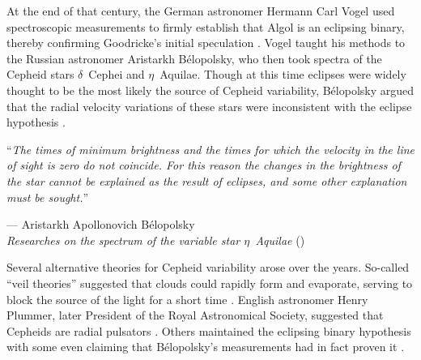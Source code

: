 
At the end of that century, the German astronomer Hermann Carl Vogel used spectroscopic measurements to firmly establish that Algol is an eclipsing binary, thereby confirming Goodricke's initial speculation \citep{1889AN....121..241V, 1908ApJ....27....1F}. 
Vogel taught his methods to the Russian astronomer Aristarkh B{\'e}lopolsky, who then took spectra of the Cepheid stars $\delta$~Cephei and $\eta$~Aquilae. 
Though at this time eclipses were widely thought to be the most likely the source of Cepheid variability, B{\'e}lopolsky argued that the radial velocity variations of these stars were inconsistent with the eclipse hypothesis \citep{1897ApJ.....6..393B, 1895ApJ.....1..160B}. 
\epigraph{``\emph{The times of minimum brightness and the times for which the velocity in the line \hphantom{``}of sight is zero do not coincide. For this reason the changes in the brightness of \hphantom{``}the star cannot be explained as the result of eclipses, and some other explanation \hphantom{``}must be sought.}''}{--- Aristarkh Apollonovich B{\'e}lopolsky \\\textit{Researches on the spectrum of the variable star $\eta$~Aquilae} (\citeyear{1897ApJ.....6..393B})}

Several alternative theories for Cepheid variability arose over the years. 
So-called ``veil theories'' suggested that clouds could rapidly form and evaporate, serving to block the source of the light for a short time \citep[e.g.,][]{1889Natur..39..606B}. 
English astronomer Henry Plummer, later President of the Royal Astronomical Society, suggested that Cepheids are radial pulsators \citep{1914MNRAS..74..660P}. 
Others maintained the eclipsing binary hypothesis \citep[e.g.,][]{1909LicOB...5...82D} with some even claiming that B{\'e}lopolsky's measurements had in fact proven it \citep[e.g.,][]{1913Obs....36...59B}. 

